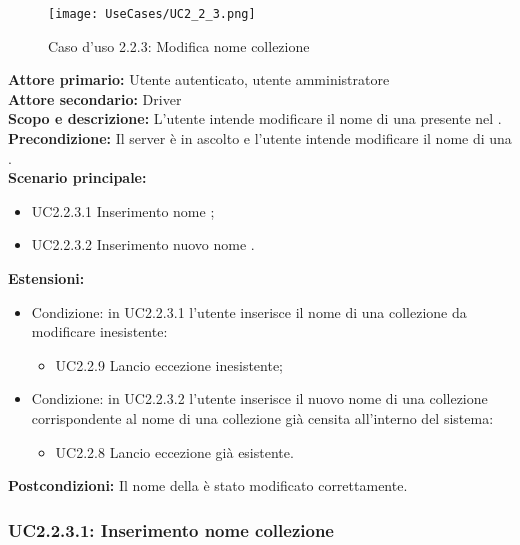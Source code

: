 \documentclass{scalatekids-article}
\begin{document}
\begin{figure}[H]
  \begin{center}
    \texttt{[image: UseCases/UC2\_2\_3.png]}
    \caption*{Caso d'uso 2.2.3: Modifica nome collezione}
  \end{center}
\end{figure}
\textbf{Attore primario:} Utente autenticato, utente amministratore\\
\textbf{Attore secondario:} Driver\\
\textbf{Scopo e descrizione:} L’utente intende modificare il nome di una  presente nel .\\
\textbf{Precondizione:} Il server è in ascolto e l’utente intende modificare il nome di una .\\
\textbf{Scenario principale:}
\begin{itemize}
\item UC2.2.3.1 Inserimento nome ;
\item UC2.2.3.2 Inserimento nuovo nome .
\end{itemize}
\textbf{Estensioni:}
\begin{itemize}
\item Condizione: in UC2.2.3.1 l'utente inserisce il nome di una collezione da modificare inesistente:
  \begin{itemize}
  \item UC2.2.9 Lancio eccezione  inesistente;
  \end{itemize}
\item Condizione: in UC2.2.3.2 l'utente inserisce il nuovo nome di una collezione corrispondente al nome di una collezione già censita all'interno del sistema:
  \begin{itemize}
  \item UC2.2.8 Lancio eccezione  già esistente.
  \end{itemize}
\end{itemize}
\textbf{Postcondizioni:} Il nome della  è stato modificato correttamente.

\subsubsection{UC2.2.3.1: Inserimento nome collezione}
\end{document}
